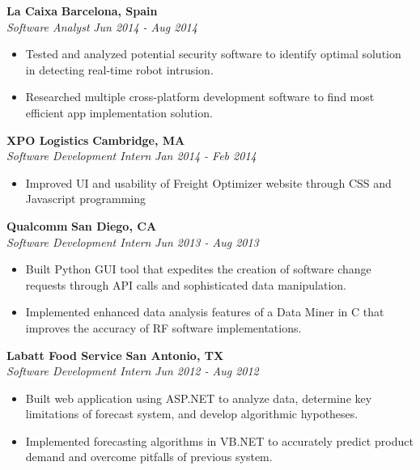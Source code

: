 \documentclass{res}
\begin{document}
\begin{resume}
\begin{itemize}
 \end{itemize}

 {\bf La Caixa} \hfill {\bf Barcelona, Spain} \\
{\textit {Software Analyst}} \hfill {\textit {Jun 2014 - Aug 2014}}
 \begin{itemize} 
\renewcommand{\labelitemi}{\ding{117}}
\itemsep -2pt  
 \item	Tested and analyzed potential security software to identify optimal solution in detecting real-time robot intrusion.
 \item  Researched multiple cross-platform development software to find most efficient app implementation solution.
 \end{itemize}

 {\bf XPO Logistics} \hfill {\bf Cambridge, MA} \\
{\textit {Software Development Intern}} \hfill {\textit {Jan 2014 - Feb 2014}} 
 \begin{itemize}
\renewcommand{\labelitemi}{\ding{117}}
\itemsep -2pt  

 \item Improved UI and usability of Freight Optimizer website through CSS and Javascript programming
 \end{itemize}

 {\bf Qualcomm} \hfill {\bf San Diego, CA} \\
{\textit {Software Development Intern}} \hfill {\textit {Jun 2013 - Aug 2013}} 
 \begin{itemize} 
\renewcommand{\labelitemi}{\ding{117}}
\itemsep -2pt  
 \item Built Python GUI tool that expedites the creation of software 
	change requests through API calls and sophisticated data manipulation.
 \item Implemented enhanced data analysis features of a Data Miner in C that
	 improves the accuracy of RF software implementations.
 \end{itemize}

 {\bf Labatt Food Service} \hfill {\bf San Antonio, TX} \\
{\textit {Software Development Intern}} \hfill {\textit {Jun 2012 - Aug 2012}} 
\begin{itemize}
\renewcommand{\labelitemi}{\ding{117}}
\itemsep -2pt  
 \item Built web application using ASP.NET to analyze data, determine key limitations of
	forecast system, and develop algorithmic hypotheses.
 \item Implemented forecasting algorithms in VB.NET to accurately predict product demand
	and overcome pitfalls of previous system.
 \end{itemize}


\end{resume}
\end{document}
